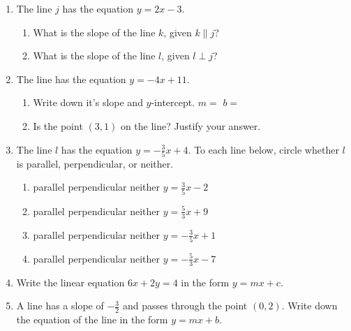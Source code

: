 \begin{enumerate}
\item The line $j$ has the equation $y=2x-3$.
  \begin{enumerate}
    \item What is the slope of the line $k$, given $k \parallel j$?
    \vspace{1cm}
    \item What is the slope of the line $l$, given $l \perp j$?
    \vspace{1cm}
  \end{enumerate}

\newpage
\item The line has the equation $y=-4x+11$. 
\begin{enumerate}
  \item Write down it's slope and $y$-intercept. \hspace{1cm} $m=$
  \hspace{2cm} $b=$
  \item Is the point $(3, 1)$ on the line? Justify your answer.
\end{enumerate}
\vspace{4cm}

\item The line $l$ has the equation $y=-\frac{3}{5}x+4$. To each line below, circle whether $l$ is parallel, perpendicular, or neither.
\begin{enumerate}
  \item parallel \quad perpendicular \quad neither \qquad $y=\frac{3}{5}x-2$
  \vspace{0.5cm}
  \item parallel \quad perpendicular \quad neither \qquad $y=\frac{5}{3}x+9$
  \vspace{0.5cm}
  \item parallel \quad perpendicular \quad neither \qquad $y=-\frac{3}{5}x+1$
  \vspace{0.5cm}
  \item parallel \quad perpendicular \quad neither \qquad $y=-\frac{5}{3}x-7$
  \vspace{0.5cm}
\end{enumerate}


\item Write the linear equation $6x+2y=4$ in the form $y=mx+c$. \vspace{4cm}

\item A line has a slope of $\displaystyle -\frac{3}{2}$ and passes through the point $(0, 2)$. Write down the equation of the line in the form $y=mx+b$. \vspace{3cm}


\end{enumerate}
